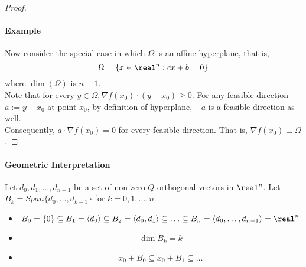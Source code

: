 \documentclass[11pt]{article}
\begin{document}
\begin{proof}
\paragraph{Example} Now consider the special case in which $\Omega$ is an affine hyperplane, that is, 
$$\Omega = \{ x \in \real^n: cx + b = 0\}$$
where $\dim(\Omega)$ is $n-1$. \\
Note that for every $y \in \Omega, \nabla f(x_0)\cdot (y - x_0) \geq 0$. For any feasible direction $a:= y - x_0$ at point $x_0$, by definition of hyperplane, $-a$ is a feasible direction as well. \\
Consequently, $a \cdot \nabla f(x_0) = 0$ for every feasible direction. That is, $\nabla f(x_0) \perp \Omega$.
\end{proof}

\paragraph{Geometric Interpretation}
Let $d_0, d_1, \hdots, d_{n-1}$ be a set of non-zero $Q$-orthogonal vectors in $\real^n$. Let $B_k = Span \{d_0, \hdots, d_{k-1}\}$ for $k = 0, 1, \hdots, n$. \\
\begin{itemize}
	\item $$B_0 = \{0\} \subseteq B_1 = \langle d_0 \rangle \subseteq B_2 = \langle d_0, d_1 \rangle \subseteq \hdots \subseteq B_n = \langle d_0, \hdots, d_{n-1} \rangle  = \real^n$$
	\item $$\dim B_k = k$$ 
	\item $$x_0 + B_0 \subseteq x_0 + B_1 \subseteq \hdots$$
\end{itemize}
\end{document}
